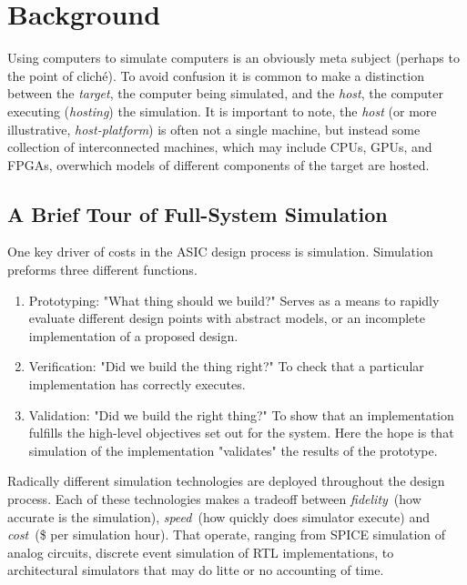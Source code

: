 
\chapter{Background}

Using computers to simulate computers is an obviously meta subject (perhaps to
the point of clich\'e). To avoid confusion it is common to make a distinction
between the \textit{target}, the computer being simulated, and the
\textit{host}, the computer executing (\textit{hosting}) the simulation. It is important
to note, the \textit{host} (or more illustrative, \textit{host-platform}) is
often not a single machine, but instead some collection of interconnected
machines, which may include CPUs, GPUs, and FPGAs, overwhich models of
different components of the target are hosted.


\section{A Brief Tour of Full-System Simulation}

One key driver of costs in the ASIC design process is simulation. Simulation preforms
three different functions.

\begin{enumerate}

    \item Prototyping: "What thing should we build?" Serves as a means to
        rapidly evaluate different design points with abstract models, or an
        incomplete implementation of a proposed design.

    \item Verification: "Did we build the thing right?" To check that a
        particular implementation has correctly executes.

    \item Validation: "Did we build the right thing?" To show that an
        implementation fulfills the high-level objectives set out for the
        system. Here the hope is that simulation of the implementation
        "validates" the results of the prototype.

\end{enumerate}

Radically different simulation technologies are deployed throughout the design
process. Each of these technologies makes a tradeoff between
\textit{fidelity}~(how accurate is the simulation), \textit{speed}~(how quickly
does simulator execute) and \textit{cost}~(\$ per simulation hour). That
operate, ranging from SPICE simulation of analog circuits, discrete event
simulation of RTL implementations, to architectural simulators that may do
litte or no accounting of time. 

